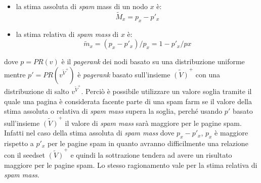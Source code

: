 \begin{itemize}
 \item la stima assoluta di \textit{spam} mass di un nodo \(x\) è:
 \begin{equation}
 \tilde{M}_x=p_x-p'_x
\end{equation}
\item la stima relativa di \textit{spam mass} di \(x\) è:
 \begin{equation}
 \tilde{m}_x=(p_x-p'_x)/p_x=1-p'_x/px
\end{equation}
\end{itemize}
dove \(p=PR(v)\) è il \textit{pagerank} dei nodi basato su una distribuzione uniforme mentre \(p'=PR(v^{\tilde{V}^+})\) è \textit{pagerank} basato sull'insieme \(\tilde{(V)}^+\)  con una distribuzione di salto \(v^{\tilde{V}^+}\). Perciò è possibile utilizzare un valore soglia tramite il quale una pagina è considerata facente parte di una spam farm se il valore della stima assoluta o relativa di \textit{spam mass} supera la soglia, perché usando \(p'\) basato sull'insieme \(\tilde{(V)}^+\) il valore di \textit{spam mass} sarà maggiore per le pagine spam. Infatti nel caso della stima assoluta di \textit{spam mass} dove \(p_x-p'_x\), \(p_x\) è maggiore rispetto a \(p'_x\) per le pagine spam in quanto avranno difficilmente una relazione con il seedset \(\tilde{(V)}^+\) e quindi la sottrazione tendera ad avere un risultato maggiore per le pagine spam. Lo stesso ragionamento vale per la stima relativa di \textit{spam mass}.

